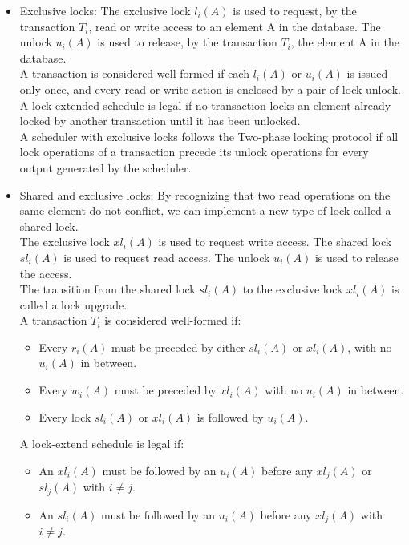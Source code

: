 \documentclass{article}
\begin{document}
\begin{itemize}
    \item Exclusive locks: The exclusive lock $l_i(A)$ is used to request, by the transaction $T_i$, read or write access to an element A in the database. The unlock $u_i(A)$ is used to release, by the transaction $T_i$, the element A in the database.
    \\
    A transaction is considered well-formed if each $l_i(A)$ or $u_i(A)$ is issued only once, and every read or write action is enclosed by a pair of lock-unlock.
    \\
    A lock-extended schedule is legal if no transaction locks an element already locked by another transaction until it has been unlocked.
    \\
    A scheduler with exclusive locks follows the Two-phase locking protocol if all lock operations of a transaction precede its unlock operations for every output generated by the scheduler.
    \item Shared and exclusive locks:
    By recognizing that two read operations on the same element do not conflict, we can implement a new type of lock called a shared lock.
    \\
    The exclusive lock $xl_i(A)$ is used to request write access. The shared lock $sl_i(A)$ is used to request read access. The unlock $u_i(A)$ is used to release the access.
    \\
    The transition from the shared lock $sl_i(A)$ to the exclusive lock $xl_i(A)$ is called a lock upgrade.
    \\
    A transaction $T_i$ is considered well-formed if:
    \begin{itemize}
        \item Every $r_i(A)$ must be preceded by either $sl_i(A)$ or $xl_i(A)$, with no $u_i(A)$ in between.
        \item Every $w_i(A)$ must be preceded by $xl_i(A)$ with no $u_i(A)$ in between.
        \item Every lock $sl_i(A)$ or $xl_i(A)$ is followed by $u_i(A)$.
    \end{itemize}
    A lock-extend schedule is legal if:
    \begin{itemize}
        \item An $xl_i(A)$ must be followed by an $u_i(A)$ before any $xl_j(A)$ or $sl_j(A)$ with $i \not= j$.
        \item An $sl_i(A)$ must be followed by an $u_i(A)$ before any $xl_j(A)$ with $i \not= j$.
    \end{itemize}

\end{itemize}
\end{document}
